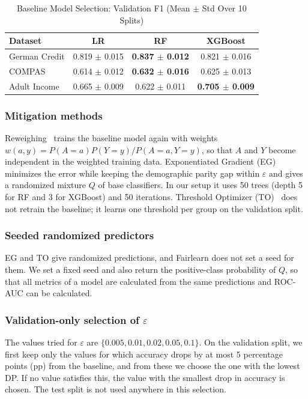 \documentclass[conference]{IEEEtran}
\newcommand{\eps}{\varepsilon}
\begin{document}
\begin{table}[t]
\centering
\caption{Baseline Model Selection: Validation F1 (Mean $\pm$ Std Over 10 Splits)}
\label{tab:select}
\renewcommand{\arraystretch}{1.12}
\footnotesize
\begin{tabular}{|l|c|c|c|}
\hline
\textbf{Dataset} & \textbf{LR} & \textbf{RF} & \textbf{XGBoost} \\
\hline
German Credit & 0.819 $\pm$ 0.015 & \textbf{0.837 $\pm$ 0.012} & 0.821 $\pm$ 0.016 \\
COMPAS & 0.614 $\pm$ 0.012 & \textbf{0.632 $\pm$ 0.016} & 0.625 $\pm$ 0.013 \\
Adult Income & 0.665 $\pm$ 0.009 & 0.622 $\pm$ 0.011 & \textbf{0.705 $\pm$ 0.009} \\
\hline
\end{tabular}
\end{table}

\subsubsection{Mitigation methods} Reweighing~\cite{kamiran2012data} trains the baseline model again with weights $w(a,y)=P(A{=}a)P(Y{=}y)/P(A{=}a,Y{=}y)$, so that $A$ and $Y$ become independent in the weighted training data. Exponentiated Gradient (EG)~\cite{agarwal2018reductions} minimizes the error while keeping the demographic parity gap within $\eps$ and gives a randomized mixture $Q$ of base classifiers. In our setup it uses 50 trees (depth 5 for RF and 3 for XGBoost) and 50 iterations. Threshold Optimizer (TO)~\cite{hardt2016equality} does not retrain the baseline; it learns one threshold per group on the validation split.

\subsubsection{Seeded randomized predictors} EG and TO give randomized predictions, and Fairlearn does not set a seed for them. We set a fixed seed and also return the positive-class probability of $Q$, so that all metrics of a model are calculated from the same predictions and ROC-AUC can be calculated.

\subsubsection{Validation-only selection of $\eps$} The values tried for $\eps$ are $\{0.005,0.01,0.02,0.05,0.1\}$. On the validation split, we first keep only the values for which accuracy drops by at most 5 percentage points (pp) from the baseline, and from these we choose the one with the lowest DP. If no value satisfies this, the value with the smallest drop in accuracy is chosen. The test split is not used anywhere in this selection.
\end{document}
